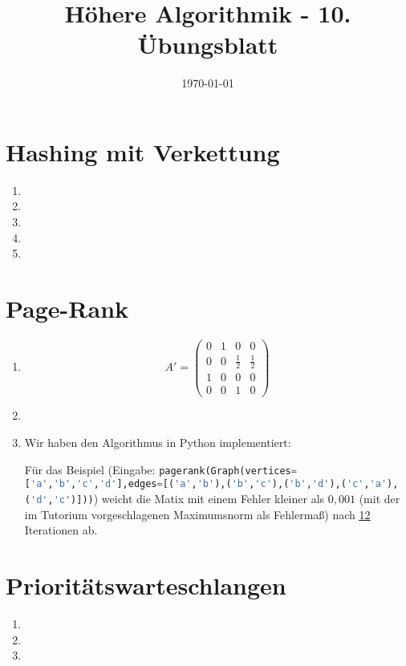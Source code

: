 \documentclass[a4paper,10pt]{article}
\title{H\"ohere Algorithmik - 10. \"Ubungsblatt}
\author{\Authors}
\date{\today}
\begin{document}
\maketitle

\section{Hashing mit Verkettung}
\begin{enumerate}
\item   
\item   
\item   
\item   
\item   
\end{enumerate}

\section{Page-Rank}
\begin{enumerate}
\item   \[
            A' = \begin{pmatrix}
                0 & 1 & 0 & 0 \\
                0 & 0 & \frac{1}{2} & \frac{1}{2} \\
                1 & 0 & 0 & 0 \\
                0 & 0 & 1 & 0
            \end{pmatrix}
        \]
\item   
\item   Wir haben den Algorithmus in Python implementiert:
        
        Für das Beispiel (Eingabe: \lstinline[language=Python]!pagerank(Graph(vertices=['a','b','c','d'],edges=[('a','b'),('b','c'),('b','d'),('c','a'),('d','c')]))!) weicht die Matix mit einem Fehler kleiner als $0{,}001$ (mit der im Tutorium vorgeschlagenen Maximumsnorm als Fehlermaß) nach \underline{\underline{12}} Iterationen ab.
\end{enumerate}

\section{Prioritätswarteschlangen}
\begin{enumerate}
\item   
\item   
\item   
\end{enumerate}
\end{document}
